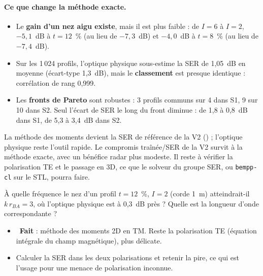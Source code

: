 \paragraph{Ce que change la méthode exacte.}
\begin{itemize}
\item Le \textbf{gain d'un nez aigu existe}, mais il est plus faible : de $I=6$ à $I=2$, $-5{,}1$~dB à $t=12$~\% (au lieu de $-7{,}3$~dB) et $-4{,}0$~dB à $t=8$~\% (au lieu de $-7{,}4$~dB).
\item Sur les 1\,024 profils, l'optique physique sous-estime la SER de 1,05~dB en moyenne (écart-type 1,3~dB), mais le \textbf{classement} est presque identique : corrélation de rang 0,999.
\item Les \textbf{fronts de Pareto} sont robustes : 3 profils communs sur 4 dans S1, 9 sur 10 dans S2. Seul l'écart de SER le long du front diminue : de 1,8 à 0,8~dB dans S1, de 5,3 à 3,4~dB dans S2.
\end{itemize}

\begin{projet}
La méthode des moments devient la SER de référence de la V2 () ; l'optique physique reste l'outil rapide. Le compromis traînée/SER de la V2 survit à la méthode exacte, avec un bénéfice radar plus modeste. Il reste à vérifier la polarisation TE et le passage en 3D, ce que le solveur du groupe SER, ou \texttt{bempp-cl} sur le STL, pourra faire.
\end{projet}

\exercices
\begin{exercice}
À quelle fréquence le nez d'un profil $t=12$~\%, $I=2$ (corde 1~m) atteindrait-il $k\,r_{BA}=3$, où l'optique physique est à 0,3~dB près ? Quelle est la longueur d'onde correspondante ?
\end{exercice}

\begin{pistes}
\begin{itemize}
\item {}~\textbf{Fait} : méthode des moments 2D en TM. Reste la polarisation TE (équation intégrale du champ magnétique), plus délicate.
\item Calculer la SER dans les deux polarisations et retenir la pire, ce qui est l'usage pour une menace de polarisation inconnue.
\end{itemize}
\end{pistes}
